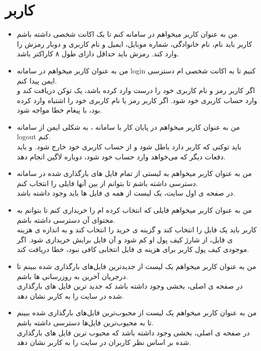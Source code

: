 \documentclass{article}
\begin{document}
\section{کاربر}
\begin{itemize}
	\item من به عنوان کاربر میخواهم در سامانه  کنم تا یک اکانت شخصی داشته باشم.
	\\
کاربر باید نام، نام خانوادگی، شماره موبایل، ایمیل و نام کاربری و دوبار رمزش را وارد کند. رمزش باید حداقل دارای طول ۸ کاراکتر باشد.	

	\item من به عنوان کاربر میخواهم در سامانه login کنیم تا به اکانت شخصی ام دسترسی ایمن پیدا کنم.
	\\
اگر کاربر رمز و نام کاربری خود را درست وارد کرده باشد، یک توکن دریافت کند و وارد حساب کاربری خود شود. اگر کاربر رمز یا نام کاربری خود را اشتباه وارد کرده بود، با پیغام خطا مواجه شود.

	
	\item من به عنوان کاربر میخواهم در پایان کار با سامانه ، به شکلی ایمن از سامانه logout کنم.
	\\
باید توکنی که کاربر دارد باطل شود و از حساب کاربری خود خارج شود. و باید دفعات دیگر که می‌خواهد وارد حساب خود شود، دوباره لاگین انجام دهد.

	\item من به عنوان کاربر میخواهم به لیستی از تمام فایل های بارگذاری شده در سامانه دسترسی داشته باشم تا بتوانم از بین آنها فایلی را انتخاب کنم.
	\\
در صفحه ی اول سایت، یک لیست از همه ی فایل ها باید وجود داشته باشد.

	\item من به عنوان کاربر میخواهم فایلی که انتخاب کرده ام را خریداری کنم تا بتوانم به محتوای آن دسترسی داشته باشم.
	\\
کاربر باید یک فابل را انتخاب کند و گزینه ی خرید را انتخاب کند و به اندازه ی هزینه ی فایل، از شارژ کیف پول او کم شود و آن فایل برایش خریداری شود. اگر موجودی کیف پول کاربر برای هزینه ی فایل انتخابی کافی نبود، خطا دریافت کند.

	\item من به عنوان کاربر میخواهم یک لیست از جدیدترین فایل‌های بارگذاری شده ببینم تا درجریان آخرین به روزرسانی ها باشم.
	\\
در صفحه ی اصلی، بخشی وجود داشته باشد که جدید ترین فایل های بارگذاری شده در سایت را به کاربر نشان دهد.

	\item من به عنوان کاربر میخواهم یک لیست از محبوب‌ترین فایل‌های بارگذاری شده ببینم تا به محبوب‌ترین‌ فایل‌ها دسترسی داشته باشم.
	\\
در صفحه ی اصلی، بخشی وجود داشته باشد که محبوب ترین فایل های بارگذاری شده  بر اساس نظر کاربران در سایت را به کاربر نشان دهد.


\end{itemize}
\end{document}
